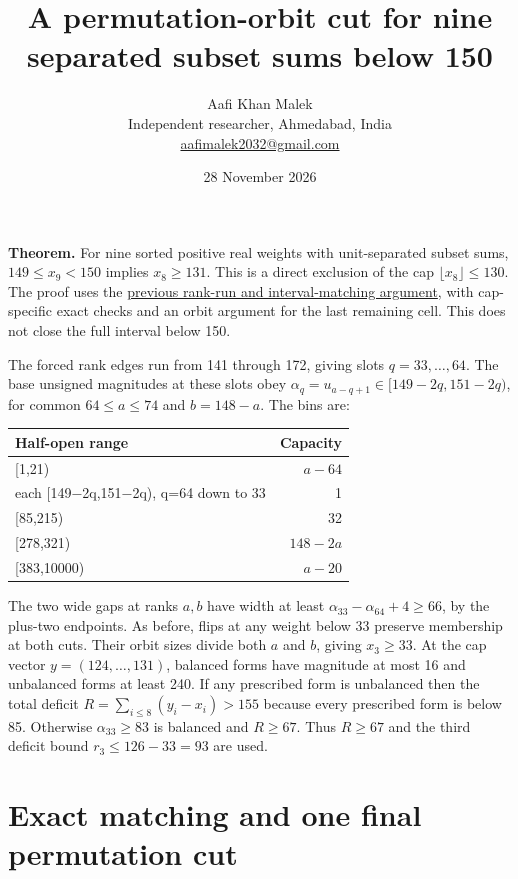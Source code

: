 \documentclass[11pt,letterpaper]{article}
\title{A permutation-orbit cut for nine separated subset sums below 150}
\author{Aafi Khan Malek\\ \small Independent researcher, Ahmedabad, India\\
\small\href{mailto:aafimalek2032@gmail.com}{aafimalek2032@gmail.com}}
\date{28 November 2026}
\begin{document}
\maketitle
\textbf{Theorem.} For nine sorted positive real weights with unit-separated
subset sums, \(149\le x_9<150\) implies \(x_8\ge131\).
This is a direct exclusion of the cap \(\lfloor x_8\rfloor\le130\).
The proof uses the
\href{https://github.com/Aafimalek/novel-discoveries/tree/ddc090f4b5de263571dcd4e0ed60b98dbfc387e6/nine-separated-subset-sums/verification/rank-cuts-below-150/penultimate-cap-127}{previous rank-run and interval-matching argument},
with cap-specific exact checks and an orbit argument for the last remaining
cell. This does not close the full interval below 150.

The forced rank edges run from 141 through 172, giving slots
\(q=33,\dots,64\). The base unsigned magnitudes at these slots obey
\(\alpha_q=u_{a-q+1}\in[149-2q,151-2q)\), for common \(64\le a\le74\)
and \(b=148-a\). The bins are:

\begin{longtable}[]{@{}lr@{}}
\toprule\noalign{}
Half-open range & Capacity \\
\midrule\noalign{}
\endhead
\bottomrule\noalign{}
\endlastfoot
{[}1,21) & \(a-64\) \\
each {[}149−2q,151−2q), q=64 down to 33 & 1 \\
{[}85,215) & 32 \\
{[}278,321) & \(148-2a\) \\
{[}383,10000) & \(a-20\) \\
\end{longtable}

The two wide gaps at ranks \(a,b\) have width at least
\(\alpha_{33}-\alpha_{64}+4\ge66\), by the plus-two endpoints. As
before, flips at any weight below 33 preserve membership at both cuts.
Their orbit sizes divide both \(a\) and \(b\), giving \(x_3\ge33\). At
the cap vector \(y=(124,\dots,131)\), balanced forms have magnitude at
most 16 and unbalanced forms at least 240. If any prescribed form is
unbalanced then the total deficit \(R=\sum_{i\le8}(y_i-x_i)>155\)
because every prescribed form is below 85. Otherwise
\(\alpha_{33}\ge83\) is balanced and \(R\ge67\). Thus \(R\ge67\) and the
third deficit bound \(r_3\le126-33=93\) are used.

\section{Exact matching and one final permutation
cut}\label{exact-matching-and-one-final-permutation-cut}
\end{document}
